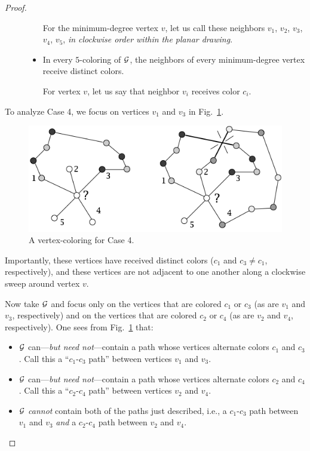 \begin{proof}
\begin{description}
\begin{itemize}
\smallskip

For the minimum-degree vertex $v$, let us call these neighbors $v_1$, $v_2$, $v_3$, $v_4$, $v_5$, {\em in clockwise order within the planar drawing}.
\medskip\item
In every $5$-coloring of $\mbox{$\cal G$}$, the neighbors of every minimum-degree vertex receive distinct colors.

\smallskip

For vertex $v$, let us say that neighbor $v_i$ receives color $c_i$.
\end{itemize}
\end{description}
To analyze Case 4, we focus on vertices $v_1$ and $v_3$ in Fig.~\ref{fig:5colorsCase4}.
\begin{figure}[hbt]
\begin{center}
   \includegraphics[scale=0.4]{FiguresGraph/5colorsCase2}
\caption{A vertex-coloring for Case 4.}
  \label{fig:5colorsCase4}
\end{center}
\end{figure}
Importantly, these vertices have received distinct colors ($c_1$ and $c_3 \neq c_1$, respectively), and these vertices are not adjacent to one another along a clockwise sweep around vertex $v$.

\smallskip

Now take $\mbox{$\cal G$}$ and focus only on the vertices that are colored $c_1$ or $c_3$ (as are $v_1$ and $v_3$, respectively) and on the vertices that are colored $c_2$ or $c_4$ (as are $v_2$ and $v_4$, respectively).  One sees from Fig.~\ref{fig:5colorsCase4} that:
\begin{itemize}
\item
$\mbox{$\cal G$}$ can---{\em but need not}---contain a path whose vertices alternate  colors $c_1$ and $c_3$. Call this a ``$c_1$-$c_3$ path'' between vertices $v_1$ and $v_3$.
\medskip\item
$\mbox{$\cal G$}$ can---{\em but need not}---contain a path whose vertices alternate colors $c_2$ and $c_4$.  Call this a ``$c_2$-$c_4$ path'' between vertices $v_2$ and $v_4$.
\medskip\item
$\mbox{$\cal G$}$ {\em cannot} contain both of the paths just described, i.e., a $c_1$-$c_3$ path between $v_1$ and $v_3$ {\em and} a $c_2$-$c_4$ path between $v_2$ and $v_4$.


\end{itemize}
\end{proof}
